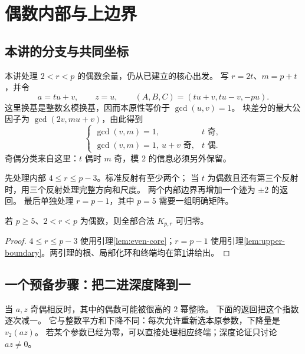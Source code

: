 \chapter{偶数内部与上边界}\label{app:lower}

\section{本讲的分支与共同坐标}
本讲处理 $2<r<p$ 的偶数余量，仍从已建立的核心出发。
写 $r=2t$、$m=p+t$，并令
\[
a=tu+v,\qquad z=u,
\qquad (A,B,C)=(tu+v,tu-v,-pu).
\]
这里换基是整数幺模换基，因而本原性等价于 $\gcd(u,v)=1$。
块差分的最大公因子为 $\gcd(2v,mu+v)$，由此得到
\[
\begin{cases}
\gcd(v,m)=1,&t\text{ 奇},\\
\gcd(v,m)=1,\ u+v\text{ 奇},&t\text{ 偶}.
\end{cases}
\]
奇偶分类来自这里：$t$ 偶时 $m$ 奇，模 $2$ 的信息必须另外保留。

先处理内部 $4\le r\le p-3$。标准反射有至少两个；
当 $t$ 为偶数且还有第三个反射时，用三个反射处理完整方向和尺度。
两个内部边界再增加一个迹为 $\pm2$ 的返回。
最后单独处理 $r=p-1$，其中 $p=5$ 需要一组明确矩阵。

\begin{proposition}[偶数余量的其余核心]\label{prop:even}
若 $p\ge5$、$2<r<p$ 为偶数，则全部合法 $K_{p,r}$ 可归零。
\end{proposition}
\begin{proof}
$4\le r\le p-3$ 使用引理\ref{lem:even-core}；$r=p-1$ 使用引理\ref{lem:upper-boundary}。两引理的根、局部化环和终端均在第\ref{app:lower}讲给出。
\end{proof}



\section{一个预备步骤：把二进深度降到一}
当 $a,z$ 奇偶相反时，其中的偶数可能被很高的 $2$ 幂整除。
下面的返回把这个指数逐次减一。
它与整数平方和下降不同：每次允许重新选本原参数，下降量是 $v_2(az)$。
若某个参数已经为零，可以直接处理相应终端；深度论证只讨论 $az\ne0$。

